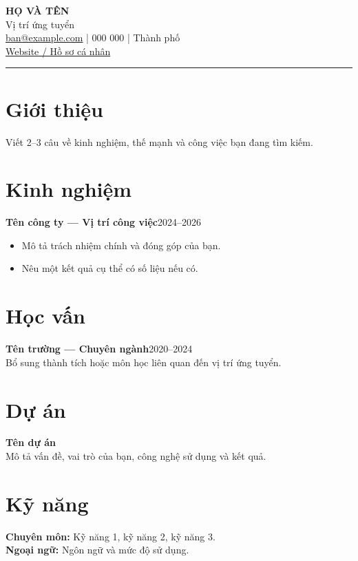 \documentclass[11pt,a4paper]{article}
\begin{document}
{\LARGE\bfseries HỌ VÀ TÊN}\\
{\large Vị trí ứng tuyển}\\
\href{mailto:ban@example.com}{ban@example.com}
\quad |  000 000 \quad | \quad Thành phố\\
\href{https://example.com}{Website / Hồ sơ cá nhân}
\hrule
\section*{Giới thiệu}
Viết 2--3 câu về kinh nghiệm, thế mạnh và công việc bạn đang tìm kiếm.
\section*{Kinh nghiệm}
\textbf{Tên công ty --- Vị trí công việc}\hfill 2024--2026
\begin{itemize}
  \item Mô tả trách nhiệm chính và đóng góp của bạn.
  \item Nêu một kết quả cụ thể có số liệu nếu có.
\end{itemize}
\section*{Học vấn}
\textbf{Tên trường --- Chuyên ngành}\hfill 2020--2024\\
Bổ sung thành tích hoặc môn học liên quan đến vị trí ứng tuyển.
\section*{Dự án}
\textbf{Tên dự án}\\
Mô tả vấn đề, vai trò của bạn, công nghệ sử dụng và kết quả.
\section*{Kỹ năng}
\textbf{Chuyên môn:} Kỹ năng 1, kỹ năng 2, kỹ năng 3.\\
\textbf{Ngoại ngữ:} Ngôn ngữ và mức độ sử dụng.
\end{document}
